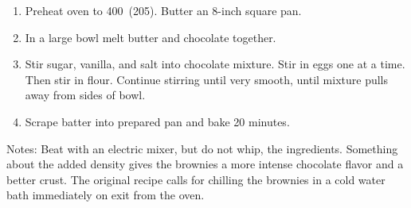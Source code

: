 
\begin{ingredients}
\end{ingredients}


\begin{recipe}
  \begin{enumerate}

  \item Preheat oven to 400\F\ (205\degreeC).  Butter an 8-inch square pan.

  \item In a large bowl melt butter and chocolate together.

  \item Stir sugar, vanilla, and salt into chocolate mixture.  Stir in
    eggs one at a time.  Then stir in flour.  Continue stirring until
    very smooth, until mixture pulls away from sides of bowl.

  \item Scrape batter into prepared pan and bake 20 minutes.

  \end{enumerate}

  Notes: Beat with an electric mixer, but do not whip, the
  ingredients.  Something about the added density gives the brownies a
  more intense chocolate flavor and a better crust.  The original
  recipe calls for chilling the brownies in a cold water bath
  immediately on exit from the oven.
\end{recipe}
